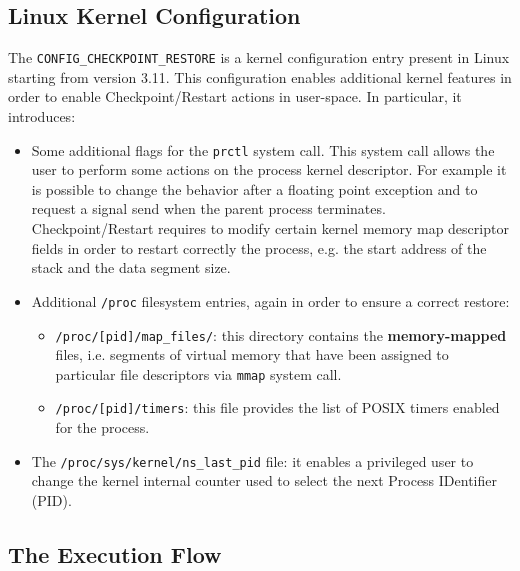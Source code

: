 

\subsection{Linux Kernel Configuration}
The \texttt{CONFIG\_CHECKPOINT\_RESTORE} is a kernel configuration entry present
in Linux starting from version 3.11. This configuration enables additional
kernel features in order to enable Checkpoint/Restart actions in
user-space. In particular, it introduces:
\begin{itemize}

\item Some additional flags for the \texttt{prctl} system call.
      This system call allows
      the user to perform some actions on the process kernel descriptor.
      For example it is possible to change the behavior after a floating
      point exception and to request a signal send when the parent process
      terminates.
      Checkpoint/Restart requires
      to modify certain kernel memory map descriptor fields in order to restart
      correctly the process, e.g. the start address of the stack and the data
      segment size.

\item Additional \texttt{/proc} filesystem entries, again in order to ensure
      a correct restore:

\begin{itemize}

\item \texttt{/proc/[pid]/map\_files/}: this directory contains the
      \textbf{memory-mapped} files, i.e. segments of virtual memory that have
      been assigned to particular file descriptors via \texttt{mmap} system
      call.

\item \texttt{/proc/[pid]/timers}: this file provides the list of POSIX timers
      enabled for the process.

\end{itemize}

\item The \texttt{/proc/sys/kernel/ns\_last\_pid} file: it enables a privileged
      user to change the kernel internal counter used to select the next
      Process IDentifier (PID).

\end{itemize}


\subsection{The Execution Flow}

